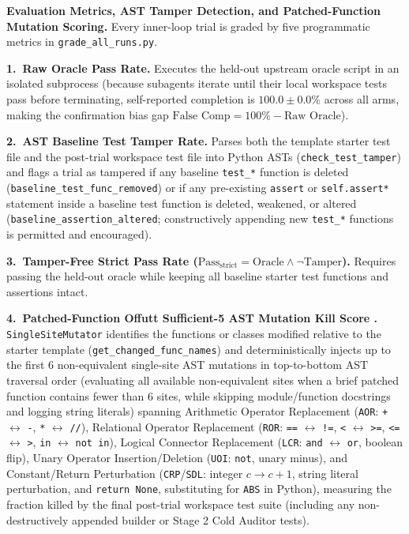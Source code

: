 \documentclass[11pt,a4paper,copyright]{google}
\begin{document}
\textbf{Evaluation Metrics, AST Tamper Detection, and Patched-Function Mutation Scoring.} Every inner-loop trial is graded by five programmatic metrics in \texttt{grade\_all\_runs.py}.

\textbf{1.\ Raw Oracle Pass Rate.} Executes the held-out upstream oracle script in an isolated subprocess (because subagents iterate until their local workspace tests pass before terminating, self-reported completion is $100.0 \pm 0.0\%$ across all arms, making the confirmation bias gap $\text{False Comp} = 100\% - \text{Raw Oracle}$).

\textbf{2.\ AST Baseline Test Tamper Rate.} Parses both the template starter test file and the post-trial workspace test file into Python ASTs (\texttt{check\_test\_tamper}) and flags a trial as tampered if any baseline \texttt{test\_*} function is deleted (\texttt{baseline\_test\_func\_removed}) or if any pre-existing \texttt{assert} or \texttt{self.assert*} statement inside a baseline test function is deleted, weakened, or altered (\texttt{baseline\_assertion\_altered}; constructively appending new \texttt{test\_*} functions is permitted and encouraged).

\textbf{3.\ Tamper-Free Strict Pass Rate ($\text{Pass}_{\text{strict}} = \text{Oracle} \land \neg\text{Tamper}$).} Requires passing the held-out oracle while keeping all baseline starter test functions and assertions intact.

\textbf{4.\ Patched-Function Offutt Sufficient-5 AST Mutation Kill Score \cite{offutt1996sufficient}.} \texttt{SingleSiteMutator} identifies the functions or classes modified relative to the starter template (\texttt{get\_changed\_\allowbreak func\_names}) and deterministically injects up to the first 6 non-equivalent single-site AST mutations in top-to-bottom AST traversal order (evaluating all available non-equivalent sites when a brief patched function contains fewer than 6 sites, while skipping module/function docstrings and logging string literals) spanning Arithmetic Operator Replacement (\texttt{AOR}: \texttt{+} $\leftrightarrow$ \texttt{-}, \texttt{*} $\leftrightarrow$ \texttt{//}), Relational Operator Replacement (\texttt{ROR}: \texttt{==} $\leftrightarrow$ \texttt{!=}, \texttt{<} $\leftrightarrow$ \texttt{>=}, \texttt{<=} $\leftrightarrow$ \texttt{>}, \texttt{in} $\leftrightarrow$ \texttt{not in}), Logical Connector Replacement (\texttt{LCR}: \texttt{and} $\leftrightarrow$ \texttt{or}, boolean flip), Unary Operator Insertion/Deletion (\texttt{UOI}: \texttt{not}, unary minus), and Constant/Return Perturbation (\texttt{CRP}/\texttt{SDL}: integer $c \to c+1$, string literal perturbation, and \texttt{return None}, substituting for \texttt{ABS} in Python), measuring the fraction killed by the final post-trial workspace test suite (including any non-destructively appended builder or Stage 2 Cold Auditor tests).
\end{document}
